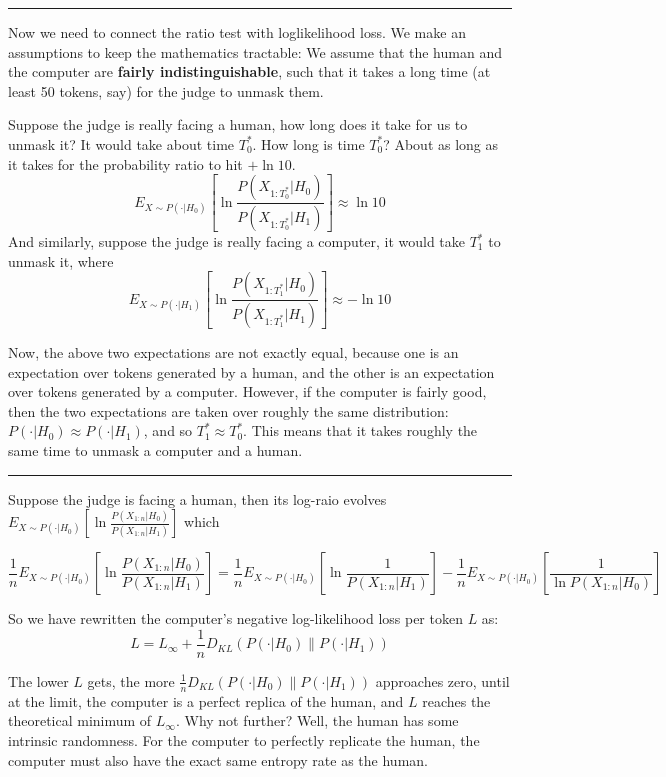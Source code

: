 \begin{center}\rule{0.5\linewidth}{0.5pt}\end{center}

Now we need to connect the ratio test with loglikelihood loss. We make an assumptions to keep the mathematics tractable: We assume that the human and the computer are \textbf{fairly indistinguishable}, such that it takes a long time (at least 50 tokens, say) for the judge to unmask them.

Suppose the judge is really facing a human, how long does it take for us to unmask it? It would take about time $T_0^*$. How long is time $T_0^*$? About as long as it takes for the probability ratio to hit $+\ln 10$.
$$E_{X \sim P(\cdot | H_0)}\left[ \ln\frac{P(X_{1:T_0^*}|H_0)}{P(X_{1:T_0^*}|H_1)}\right] \approx \ln 10$$
And similarly, suppose the judge is really facing a computer, it would take $T_1^*$ to unmask it, where
$$E_{X \sim P(\cdot | H_1)}\left[ \ln\frac{P(X_{1:T_1^*}|H_0)}{P(X_{1:T_1^*}|H_1)}\right] \approx -\ln 10$$

Now, the above two expectations are not exactly equal, because one is an expectation over tokens generated by a human, and the other is an expectation over tokens generated by a computer. However, if the computer is fairly good, then the two expectations are taken over roughly the same distribution: $P(\cdot | H_0) \approx P(\cdot |H_1)$, and so $T_1^* \approx T_0^*$. This means that it takes roughly the same time to unmask a computer and a human.

\begin{center}\rule{0.5\linewidth}{0.5pt}\end{center}

Suppose the judge is facing a human, then its log-raio evolves $E_{X \sim P(\cdot | H_0)}\left[ \ln\frac{P(X_{1:n}|H_0)}{P(X_{1:n}|H_1)}\right]$ which 

$$\frac 1n E_{X \sim P(\cdot | H_0)}\left[ \ln\frac{P(X_{1:n}|H_0)}{P(X_{1:n}|H_1)}\right] = \frac 1n 
 E_{X \sim P(\cdot | H_0)}\left[ \ln\frac{1}{P(X_{1:n}|H_1)}\right] - \frac 1n  E_{X \sim P(\cdot | H_0)}\left[ \frac{1}{\ln P(X_{1:n}|H_0)}\right]$$

So we have rewritten the computer's negative log-likelihood loss per token $L$ as:
$$L = L_\infty + \frac 1n D_{KL}(P(\cdot | H_0)\| P(\cdot | H_1)) $$

The lower $L$ gets, the more $\frac 1n D_{KL}(P(\cdot | H_0)\| P(\cdot | H_1))$ approaches zero, until at the limit, the computer is a perfect replica of the human, and $L$ reaches the theoretical minimum of $L_\infty$. Why not further? Well, the human has some intrinsic randomness. For the computer to perfectly replicate the human, the computer must also have the exact same entropy rate as the human.

